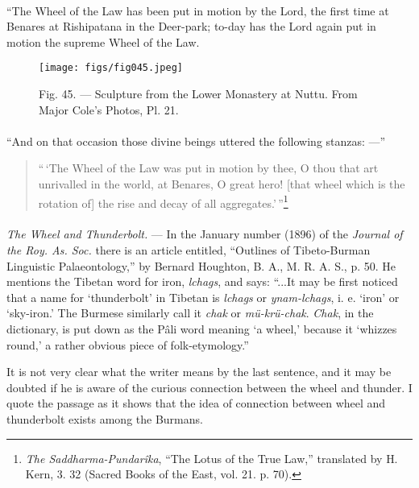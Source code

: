 \documentclass[a4paper, 11pt, oneside, polutonikogreek, english]{article}
\begin{document}
\paragraph{}
``The Wheel of the Law has been put in motion by the Lord, the first time at Benares at Rishipatana in the Deer-park; to-day has the Lord again put in motion the supreme Wheel of the Law.

\begin{figure}[H]
\centering
\texttt{[image: figs/fig045.jpeg]}
\caption[Fig. 45. --- Sculpture from the Lower Monastery at Nuttu.]{Fig. 45. --- Sculpture from the Lower Monastery at Nuttu. From Major Cole's Photos, Pl. 21.}
\end{figure}
\paragraph{}
``And on that occasion those divine beings uttered the following stanzas: ---''

\begin{quotation}\small
``\,`The Wheel of the Law was put in motion by thee, O thou that art unrivalled in the world, at Benares, O great hero! [that wheel which is the rotation of] the rise and decay of all aggregates.'\,''\footnote{\emph{The Saddharma-Pundarîka}, ``The Lotus of the True Law,'' translated by H. Kern, 3. 32 (Sacred Books of the East, vol. 21. p. 70).}
\end{quotation}
\paragraph{}
\emph{The Wheel and Thunderbolt.} --- In the January number (1896) of the \emph{Journal of the Roy. As. Soc.} there is an article entitled, ``Outlines of Tibeto-Burman Linguistic Palaeontology,'' by Bernard Houghton, B. A., M. R. A. S., p. 50. He mentions the Tibetan word for iron, \emph{lchags}, and says: ``...It may be first noticed that a name for `thunderbolt' in Tibetan is \emph{lchags} or \emph{ynam-lchags}, i. e. `iron' or `sky-iron.' The Burmese similarly call it \emph{chak} or \emph{mü-krü-chak}. \emph{Chak}, in the dictionary, is put down as the Pâli word meaning `a wheel,' because it `whizzes round,' a rather obvious piece of folk-etymology.''

It is not very clear what the writer means by the last sentence, and it may be doubted if he is aware of the curious connection between the wheel and thunder. I quote the passage as it shows that the idea of connection between wheel and thunderbolt exists among the Burmans.
\end{document}
